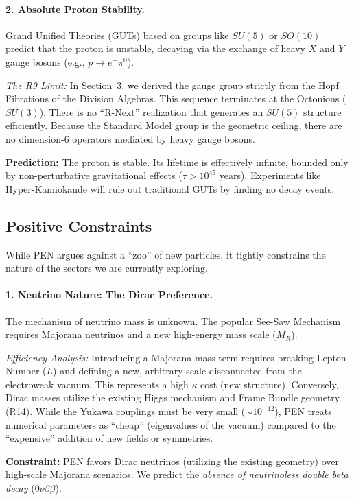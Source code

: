 \documentclass[12pt,a4paper]{article}
\theoremstyle{definition}
\newcommand{\kap}{\kappa}
\begin{document}
\paragraph{2. Absolute Proton Stability.}
Grand Unified Theories (GUTs) based on groups like $SU(5)$ or $SO(10)$ predict that the proton is unstable, decaying via the exchange of heavy $X$ and $Y$ gauge bosons (e.g., $p \to e^+ \pi^0$).

\emph{The R9 Limit:} In Section~3, we derived the gauge group strictly from the Hopf Fibrations of the Division Algebras. This sequence terminates at the Octonions ($SU(3)$). There is no ``R-Next'' realization that generates an $SU(5)$ structure efficiently. Because the Standard Model group is the geometric ceiling, there are no dimension-6 operators mediated by heavy gauge bosons.

\textbf{Prediction:} The proton is stable. Its lifetime is effectively infinite, bounded only by non-perturbative gravitational effects ($\tau > 10^{45}$ years). Experiments like Hyper-Kamiokande will rule out traditional GUTs by finding no decay events.

\subsection{Positive Constraints}

While PEN argues against a ``zoo'' of new particles, it tightly constrains the nature of the sectors we are currently exploring.

\paragraph{1. Neutrino Nature: The Dirac Preference.}
The mechanism of neutrino mass is unknown. The popular See-Saw Mechanism requires Majorana neutrinos and a new high-energy mass scale ($M_R$).

\emph{Efficiency Analysis:} Introducing a Majorana mass term requires breaking Lepton Number ($L$) and defining a new, arbitrary scale disconnected from the electroweak vacuum. This represents a high $\kap$ cost (new structure). Conversely, Dirac masses utilize the existing Higgs mechanism and Frame Bundle geometry (R14). While the Yukawa couplings must be very small ($\sim 10^{-12}$), PEN treats numerical parameters as ``cheap'' (eigenvalues of the vacuum) compared to the ``expensive'' addition of new fields or symmetries.

\textbf{Constraint:} PEN favors Dirac neutrinos (utilizing the existing geometry) over high-scale Majorana scenarios. We predict the \emph{absence of neutrinoless double beta decay} ($0\nu\beta\beta$).
\end{document}

